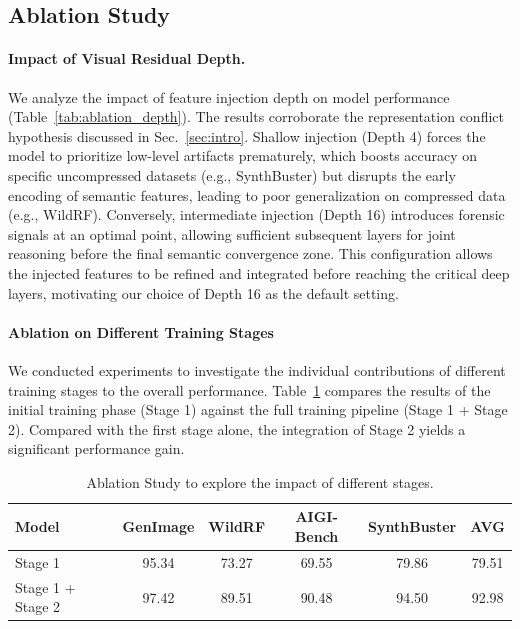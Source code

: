 \documentclass{article}
\theoremstyle{plain}
\theoremstyle{definition}
\theoremstyle{remark}
\begin{document}
\subsection{Ablation Study}

\paragraph{Impact of Visual Residual Depth.}
We analyze the impact of feature injection depth on model performance (Table~\ref{tab:ablation_depth}).
The results corroborate the representation conflict hypothesis discussed in Sec.~\ref{sec:intro}.
Shallow injection (Depth 4) forces the model to prioritize low-level artifacts prematurely, which boosts accuracy on specific uncompressed datasets (e.g., SynthBuster) but disrupts the early encoding of semantic features, leading to poor generalization on compressed data (e.g., WildRF).
Conversely, intermediate injection (Depth 16) introduces forensic signals at an optimal point, allowing sufficient subsequent layers for joint reasoning before the final semantic convergence zone.
This configuration allows the injected features to be refined and integrated before reaching the critical deep layers, motivating our choice of Depth 16 as the default setting.





\paragraph{Ablation on Different Training Stages}
We conducted experiments to investigate the individual contributions of different training stages to the overall performance. Table~\ref{tab:ablation_stage} compares the results of the initial training phase (Stage 1) against the full training pipeline (Stage 1 + Stage 2). Compared with the first stage alone, the integration of Stage 2 yields a significant performance gain.

\begin{table}[t]
  \centering
  \tiny
  \caption{Ablation Study to explore the impact of different stages.}
  \label{tab:ablation_stage}
  \begin{tabular}{l|cccc|c}
    \toprule
    \textbf{Model} &GenImage &WildRF &AIGI-Bench &SynthBuster &\textbf{AVG} \\
    \midrule
    Stage 1 &95.34 &73.27 &69.55 &79.86 &79.51 \\
    Stage 1 + Stage 2 &97.42 &89.51 &90.48 &94.50 &92.98 \\
    \bottomrule
  \end{tabular}
\end{table}
\end{document}
